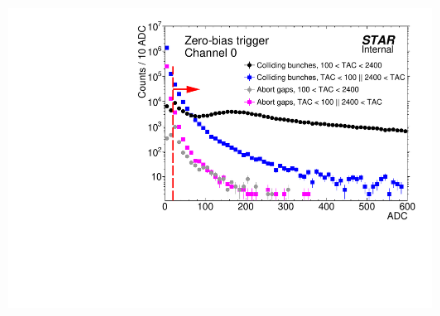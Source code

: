 \begin{figure}[hb]
{  \includegraphics[width=\linewidth,page=4]{graphics/eventSelection/bbc/Bbc_ADC.pdf}
}%
\end{figure}
